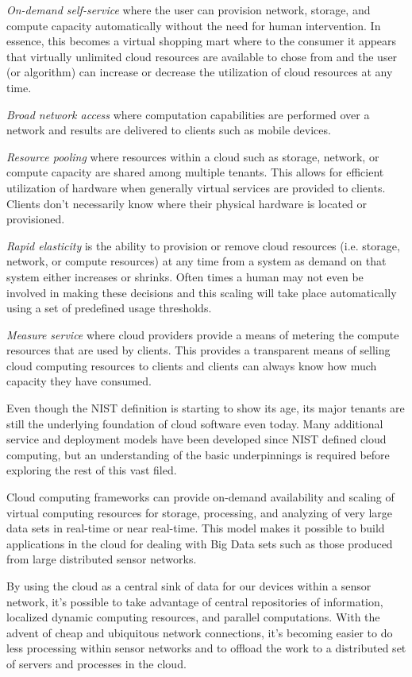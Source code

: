 \documentclass[]{article}
\begin{document}
\textit{On-demand self-service} where the user can provision network, storage, and compute capacity automatically without the need for human intervention. In essence, this becomes a virtual shopping mart where to the consumer it appears that virtually unlimited cloud resources are available to chose from and the user (or algorithm) can increase or decrease the utilization of cloud resources at any time.

\textit{Broad network access} where computation capabilities are performed over a network and results are delivered to clients such as mobile devices. 

\textit{Resource pooling} where resources within a cloud such as storage, network, or compute capacity are shared among multiple tenants. This allows for efficient utilization of hardware when generally virtual services are provided to clients. Clients don't necessarily know where their physical hardware is located or provisioned. 

\textit{Rapid elasticity} is the ability to provision or remove cloud resources (i.e. storage, network, or compute resources) at any time from a system as demand on that system either increases or shrinks. Often times a human may not even be involved in making these decisions and this scaling will take place automatically using a set of predefined usage thresholds.

\textit{Measure service} where cloud providers provide a means of metering the compute resources that are used by clients. This provides a transparent means of selling cloud computing resources to clients and clients can always know how much capacity they have consumed.

Even though the NIST definition is starting to show its age, its major tenants are still the underlying foundation of cloud software even today. Many additional service and deployment models have been developed since NIST defined cloud computing, but an understanding of the basic underpinnings is required before exploring the rest of this vast filed.

Cloud computing frameworks can provide on-demand availability and scaling of virtual computing resources for storage, processing, and analyzing of very large data sets in real-time or near real-time. This model makes it possible to build applications in the cloud for dealing with Big Data sets such as those produced from large distributed sensor networks.

By using the cloud as a central sink of data for our devices within a sensor network, it's possible to take advantage of central repositories of information, localized dynamic computing resources, and parallel computations.  With the advent of cheap and ubiquitous network connections, it's becoming easier to do less processing within sensor networks and to offload the work to a distributed set of servers and processes in the cloud\cite{kamburugamuve_framework_2015}.
\end{document}
